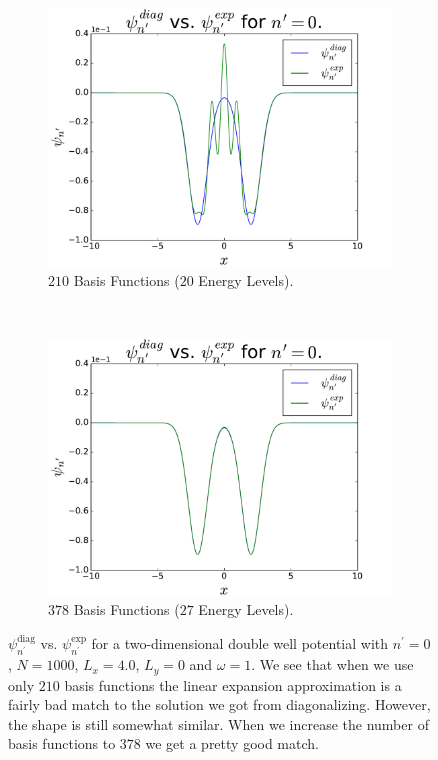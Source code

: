\documentclass[../main.tex]{subfiles}
\begin{document}
\begin{figure}
    \centering
    \begin{subfigure}{0.5\textwidth}
        \centering
        \includegraphics[scale=0.4]{figures/psiComp_nPrime0_BF210}
        \caption{$210$ Basis Functions ($20$ Energy Levels).}
        \label{fig:nPrime0a}
    \end{subfigure}%
    ~ 
    \begin{subfigure}{0.5\textwidth}
        \centering
        \includegraphics[scale=0.4]{figures/psiComp_nPrime0_BF378}
        \caption{$378$ Basis Functions ($27$ Energy Levels).}
        \label{fig:nPrime0b}
    \end{subfigure}
    \caption{$\psi_{n^\prime}^\textrm{diag}$ vs. $\psi_{n^\prime}^\textrm{exp}$ for a two-dimensional double well potential with $n^\prime = 0$, $N=1000$, $L_x = 4.0$, $L_y = 0$ and $\omega = 1$. We see that when we use only $210$ basis functions the linear expansion approximation is a fairly bad match to the solution we got from diagonalizing. However, the shape is still somewhat similar. When we increase the number of basis functions to $378$ we get a pretty good match.}
    \label{fig:nPrime0}
\end{figure}
\end{document}
